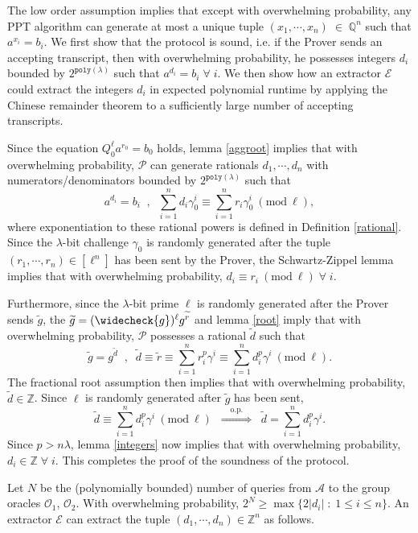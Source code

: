 \documentclass[11pt, lettersize, notitlepage, leqno, footskip=0.6cm]{article}
\newcommand{\bz}{\mathbb Z}
\newcommand{\bq}{\mathbb Q}
\newcommand{\slim}{\sum\limits}
\newcommand{\ttt}{\texttt}
\newcommand{\impop}{\overset{\;\;\;\;\mr{o.p.}\;\;\;\;}{\Longrightarrow}}
\newcommand{\wti}{\widetilde}
\newcommand{\mc}{\mathcal}
\newcommand{\mr}{\mathrm}
\newcommand{\lam}{\lambda}
\newcommand{\weck}{\widecheck}
\newcommand{\mP}{\mc{P}}
\newcommand{\A}{\mc{A}}
\newcommand{\vs}{\vspace{-0.15cm}}
\newcommand{\op}{overwhelming probability}
\newcommand{\Mod}[1]{\ (\mathrm{mod}\ #1)}
\newcommand{\E}{\mc{E}}
\numberwithin{equation}{section}
\begin{document}
\begin{prf} The low order assumption implies that except with \op, any PPT algorithm can generate at most a unique tuple $(x_1,\cdots,x_n)\;\in\;\bq^n$ such that $a^{x_i} = b_i$. We first show that the protocol is sound, i.e. if the Prover sends an accepting transcript, then with \op, he possesses integers $d_i$ bounded by $2^{\ttt{poly}(\lam)}$ such that $a^{d_i} = b_i\;\forall\;i$. We then show how an extractor $\E$ could extract the integers $d_i$ in expected polynomial runtime by applying the Chinese remainder theorem to a sufficiently large number of accepting transcripts. 

Since the equation $Q_0^{\ell}a^{r_0} = b_0$ holds, lemma \ref{aggroot} implies that with \op, 
$\mP$ can generate rationals $d_1,\cdots,d_n$ with numerators/denominators bounded by $2^{\ttt{poly}(\lam)}$ such that \vs $$a^{d_i} = b_i \;\;,\;\;\slim_{i=1}^{n} d_i\gamma_{0}^i \equiv \slim_{i=1}^{n} r_i\gamma_{0}^i\Mod{\ell},$$ where exponentiation to these rational powers is defined in Definition \ref{rational}. Since the $\lam$-bit challenge $\gamma_{0}$ is randomly generated after the tuple $(r_1,\cdots,r_n)\in[\ell^n]$ has been sent by the Prover, the Schwartz-Zippel lemma implies that with \op, $d_i\equiv r_i\Mod{\ell}\;\forall\;i$. 

Furthermore, since the $\lam$-bit prime $\ell$ is randomly generated after the Prover sends $\wti{g}$, the $\wti{g} = (\weck{g})^{\ell}g^{\wti{r}}$ and lemma \ref{root} imply that with \op, $\mP$ possesses a rational $\wti{d}$ such that \vs $$\wti{g} = g^{\wti{d}}\;\;,\;\;\wti{d}\equiv\wti{r}\equiv \slim_{i=1}^n r_i^p\gamma^i\equiv \slim_{i=1}^n d_i^p\gamma^i\Mod{\ell} .$$ The fractional root assumption then implies that with \op, $\wti{d}\in \bz$. Since $\ell$ is randomly generated after $\wti{g}$ has been sent, \vs $$\wti{d}\equiv \slim_{i=1}^n d_i^p\gamma^i\Mod{\ell}\;\;\impop\;\;\wti{d} = \slim_{i=1}^n d_i^p\gamma^i.$$ Since $p> n\lam$, lemma \ref{integers} now implies that with \op, $d_i\in\bz\;\forall\;i$. This completes the proof of the soundness of the protocol.

Let $N$ be the (polynomially bounded) number of queries from $\A$ to the group oracles $\mc{O}_1$, $\mc{O}_2$. With \op, $2^{N} \geq \max\{2|d_i|\;:\;1\leq i\leq n \}$. An extractor $\E$ can extract the tuple $(d_1,\cdots,d_n)\in\bz^n$ as follows. 


\end{prf}
\end{document}
